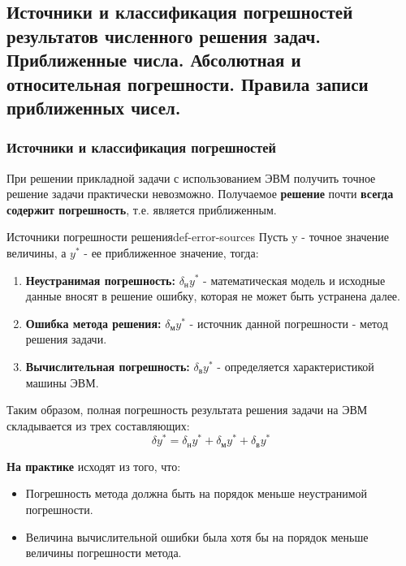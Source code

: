 \documentclass[14pt]{extarticle}
\begin{document}
\clearpage
\subsection{Источники и классификация погрешностей результатов численного решения задач. Приближенные числа. Абсолютная и относительная погрешности. Правила записи приближенных чисел.}

    \subsubsection{Источники и классификация погрешностей}

        При решении прикладной задачи с использованием ЭВМ получить точное решение задачи практически невозможно. Получаемое \textbf{решение} почти \textbf{всегда содержит погрешность}, т.е. является приближенным. 
        \begin{definition}{Источники погрешности решения}{def-error-sources}
            Пусть y - точное значение величины, а $y^{*}$ - ее приближенное значение, тогда:
            
            \begin{enumerate}
                \item \textbf{Неустранимая погрешность:} $\delta_{\text{н}}y^{*}$ - математическая модель и исходные данные вносят в решение ошибку, которая не может быть устранена далее.
                \item \textbf{Ошибка метода решения:} $\delta_{\text{м}}y^{*}$ - источник данной погрешности - метод решения задачи.
                \item \textbf{Вычислительная погрешность:} $\delta_{\text{в}}y^{*}$ - определяется характеристикой машины ЭВМ.
            \end{enumerate}
        \end{definition}

        Таким образом, полная погрешность результата решения задачи на ЭВМ складывается из трех составляющих:
        $$\delta y^{*} = \delta_{\text{н}}y^{*} + \delta_{\text{м}}y^{*} + \delta_{\text{в}}y^{*}$$

        \textbf{На практике} исходят из того, что: 
        \begin{itemize}
            \item Погрешность метода должна быть на порядок меньше неустранимой погрешности.
            \item Величина вычислительной ошибки была хотя бы на порядок меньше величины погрешности метода.
        \end{itemize}
\end{document}

